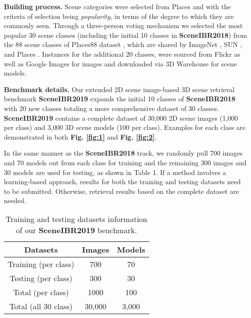 \documentclass[../main.tex]{subfiles}
\begin{document}
\textbf{Building process.} 
Scene categories were selected from  Places \cite{zhou2017places} and with the criteria of selection being \textit{popularity}, in terms of the degree to which they are commonly seen. Through a three-person voting mechanism we selected the most popular 30 scene classes (including the initial 10 classes in \textbf{SceneIBR2018}) from the 88 scene classes of Places88 dataset \cite{Places88}, which are shared by ImageNet \cite{ImageNet}, SUN \cite{SUN}, and Places \cite{zhou2017places}. 
Instances for the additional 20 classes, were sourced from Flickr \cite{Flickr} as well as Google Images\cite{GoogleImages} for images and downloaded via 3D Warehouse \cite{3DWarehouse} for scene models. 

\textbf{Benchmark details.} Our extended 2D scene image-based 3D scene retrieval benchmark \textbf{SceneIBR2019} expands the initial 10 classes of \textbf{SceneIBR2018} with 20 new classes totaling a more comprehensive dataset of 30 classes. \textbf{SceneIBR2019} contains a complete dataset of 30,000 2D scene images (1,000 per class) and 3,000 3D scene models (100 per class). Examples for each class are demonstrated in both \textbf{Fig. \ref{fig:1}} and \textbf{Fig. \ref{fig:2}}.

In the same manner as the \textbf{SceneIBR2018} track, we randomly pull 700 images and 70 models out from each class for training and the remaining 300 images and 30 models are used for testing, as shown in Table 1. If a method involves a learning-based approach, results for both the training and testing datasets need to be submitted. Otherwise, retrieval results based on the complete dataset are needed.


\begin{table}[h]
	\centering
	\caption{Training and testing datasets information of our \textbf{SceneIBR2019} benchmark.}
	\begin{center}
		\begin{tabular}  {|c|c|c|}
			\hline
			\textbf{\normalsize{Datasets}} & \textbf{\normalsize{Images}} & \textbf{\normalsize{Models}}\\
			\hline
			\normalsize{Training (per class)}  & 700  & 70  \\
			\hline
			\normalsize{Testing (per class)}  & 300  & 30  \\
			\hline
			\normalsize{Total (per class)}  & 1000  & 100  \\
			\hline
			\normalsize{Total (all 30 class)}  & 30,000  & 3,000  \\
			\hline
		\end{tabular}
	\end{center}
	\label{table1}
\end{table}
\end{document}
